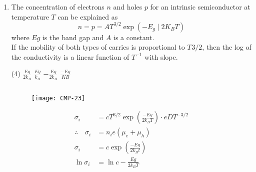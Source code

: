 \begin{enumerate}
	\begin{tasks}(4)
		\task[\textbf{a.}]$8 n^{-1} m^{-1}$
		\task[\textbf{b.}]$32 \Omega^{-1} \mathrm{~m}^{-1}$
		\task[\textbf{c.}]$20.8\Omega^{-1}m^{-1}$
		\task[\textbf{d.}]  $83.2 \Omega^{-1}m^{-1}$
	\end{tasks}
\begin{answer}
	\begin{align*}
	\text{doping of }Al&>\text{ doping of }\rho\\
	ie \quad\rho-&\text{type semiconductor.}\\
	\text{majority carrier conc }&=(2.5-1.5)\times10^{21}/m^3\\
	&=10^{21}/m^3\\
	\sigma &=p e \mu_{h} \\
	& \approx 10^{21} \times 1.6 \times 10^{-19} \times 0.05\\
	&=8\Omega^{-1}m^{-1}
	\end{align*}
	So the correct answer is \textbf{Option (a)}
\end{answer}
\item 
	The concentration of electrons $n$ and holes $p$ for an intrinsic semiconductor at temperature $T$ can be explained as 
	$$n=p=A T^{3 / 2} \exp \left(-E_{g} \mid 2 K_{B} T\right)$$
	where $Eg$ is the band gap and $A$ is a constant.\\
	If the mobility of both types of carries is proportional to $T^{}3/2$, then the log of the conductivity is a linear function of $T^{-1}$ with slope.
	\begin{tasks}(4)
		\task[\textbf{a.}]$\frac{E g}{2 k_{B}}$
		\task[\textbf{b.}]$\frac{E g}{k_{B}}$
		\task[\textbf{c.}]$-\frac{E g}{2 k_{B}}$
		\task[\textbf{d.}] $\frac{-E g}{K B}$
	\end{tasks}
\begin{answer}$\left. \right. $
	\begin{figure}[H]
		\centering
		\texttt{[image: CMP-23]}
		\caption{}
		\label{}
	\end{figure}
	\begin{align*}
	\sigma_{i}&=c T^{3 / 2} \exp \left(\frac{-E g}{2 k_{B} T}\right) \cdot e D T^{-3 / 2}\\
	\therefore \quad \sigma_{i}&=n_{i} e\left(\mu_{e}+\mu_{h}\right)\hspace{1cm}\\
	\sigma_{i}&=c \exp \left(\frac{-E g}{2 k_{B} t}\right)\\
	\ln \sigma_{i}&=\ln c-\frac{E g}{2 k_{B} T}\\

\end{align*}
\end{answer}
\end{enumerate}
